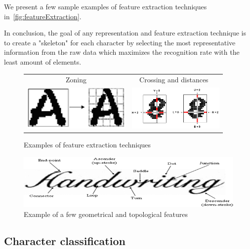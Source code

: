 We present a few sample examples of feature extraction techniques in~\cref{fig:featureExtraction}.

In conclusion, the goal of any representation and feature extraction technique is to create a "skeleton" for each character by selecting the most representative information from the raw data which maximizes the recognition rate with the least amount of elements. 

\begin{figure}[t]
\centering
{\sffamily
\begin{tabular}{cc}
Zoning & Crossing and distances~\citep{crossingAndDistances}\\
\includegraphics[height=6em]{img/textDetection/feature_zoning.png}
&
\includegraphics[height=6em]{img/textDetection/feature_crossing.png}
\end{tabular}
}
\caption{Examples of feature extraction techniques}
\label{fig:featureExtractionStatistical}
\end{figure}

\begin{figure}[t]
\centering
\includegraphics[width=0.8\linewidth]{img/textDetection/features_geometrical.png}
\caption{Example of a few geometrical and topological features~\citep{geometricalFeatures}}
\label{fig:featureExtractionGeometrical}
\end{figure}


\subsection{Character classification}

